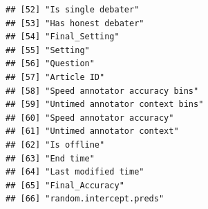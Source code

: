 \documentclass[
]{article}
\newenvironment{Shaded}{\begin{snugshade}}{\end{snugshade}}
\newcommand{\AttributeTok}[1]{\textcolor[rgb]{0.13,0.29,0.53}{#1}}
\newcommand{\FunctionTok}[1]{\textcolor[rgb]{0.13,0.29,0.53}{\textbf{#1}}}
\newcommand{\NormalTok}[1]{#1}
\newcommand{\OtherTok}[1]{\textcolor[rgb]{0.56,0.35,0.01}{#1}}
\newcommand{\SpecialCharTok}[1]{\textcolor[rgb]{0.81,0.36,0.00}{\textbf{#1}}}
\newcommand{\StringTok}[1]{\textcolor[rgb]{0.31,0.60,0.02}{#1}}
\begin{document}
\begin{verbatim}
## [52] "Is single debater"                      
## [53] "Has honest debater"                     
## [54] "Final_Setting"                          
## [55] "Setting"                                
## [56] "Question"                               
## [57] "Article ID"                             
## [58] "Speed annotator accuracy bins"          
## [59] "Untimed annotator context bins"         
## [60] "Speed annotator accuracy"               
## [61] "Untimed annotator context"              
## [62] "Is offline"                             
## [63] "End time"                               
## [64] "Last modified time"                     
## [65] "Final_Accuracy"                         
## [66] "random.intercept.preds"
\end{verbatim}

\begin{Shaded}
\end{Shaded}
\end{document}
